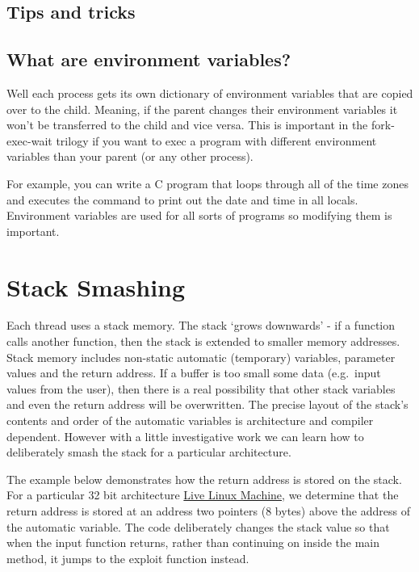 
\subsection{Tips and tricks}


\subsection{What are environment variables?}

Well each process gets its own dictionary of environment variables that are copied over to the child. Meaning, if the parent changes their environment variables it won't be transferred to the child and vice versa. This is important in the fork-exec-wait trilogy if you want to exec a program with different environment variables than your parent (or any other process).

For example, you can write a C program that loops through all of the time zones and executes the  command to print out the date and time in all locals. Environment variables are used for all sorts of programs so modifying them is important.

\section{Stack Smashing}\label{stack-smashing}

Each thread uses a stack memory. The stack `grows downwards' - if a function calls another function, then the stack is extended to smaller memory addresses. Stack memory includes non-static automatic (temporary) variables, parameter values and the return address. If a buffer is too small some data (e.g.~input values from the user), then there is a real possibility that other stack variables and even the return address will be overwritten. The precise layout of the stack's contents and order of the automatic variables is architecture and compiler dependent. However with a little investigative work we can learn how to deliberately smash the stack for a particular architecture.

The example below demonstrates how the return address is stored on the stack. For a particular 32 bit architecture \href{http://cs-education.github.io/sys/}{Live Linux Machine}, we determine that the return address is stored at an address two pointers (8 bytes) above the address of the automatic variable. The code deliberately changes the stack value so that when the input function returns, rather than continuing on inside the main method, it jumps to the exploit function instead.

